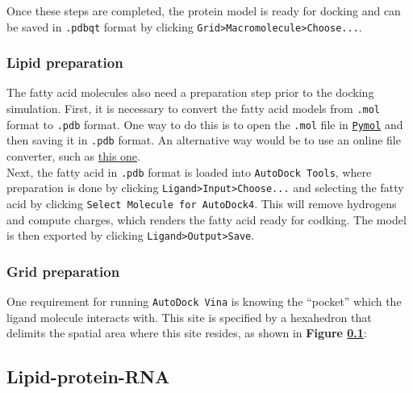 Once these steps are completed, the protein model is ready for docking and can be saved in \texttt{.pdbqt} format by clicking \texttt{Grid>Macromolecule>Choose...}.

\subsubsection{Lipid preparation}

The fatty acid molecules also need a preparation step prior to the docking simulation. First, it is necessary to convert the fatty acid models from \texttt{.mol} format to \texttt{.pdb} format. One way to do this is to open the \texttt{.mol} file in \href{https://pymol.org/2/}{\texttt{Pymol}} and then saving it in \texttt{.pdb} format. An alternative way would be to use an online file converter, such as \href{https://datascience.unm.edu/tomcat/biocomp/convert}{this one}.\\

Next, the fatty acid in \texttt{.pdb} format is loaded into \texttt{AutoDock Tools}, where preparation is done by clicking \texttt{Ligand>Input>Choose...} and selecting the fatty acid by clicking \texttt{Select Molecule for AutoDock4}. This will remove hydrogens and compute charges, which renders the fatty acid ready for codking. The model is then exported by clicking \texttt{Ligand>Output>Save}.

\subsubsection{Grid preparation}

One requirement for running \texttt{AutoDock Vina} is knowing the ``pocket'' which the ligand molecule interacts with. This site is specified by a hexahedron that delimits the spatial area where this site resides, as shown in \textbf{Figure \ref{}}:



\subsection{Lipid-protein-RNA}
